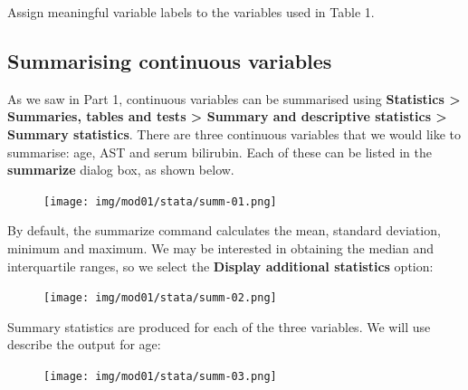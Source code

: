 \documentclass[
  a4paper,
]{memoir}
\begin{document}
\begin{tcolorbox}[enhanced jigsaw, title={TASK}, opacitybacktitle=0.6, colbacktitle=quarto-callout-note-color!10!white, titlerule=0mm, colframe=quarto-callout-note-color-frame, opacityback=0, left=2mm, breakable, bottomtitle=1mm, coltitle=black, bottomrule=.15mm, arc=.35mm, rightrule=.15mm, toptitle=1mm, colback=white, toprule=.15mm, leftrule=.75mm]

Assign meaningful variable labels to the variables used in Table 1.

\end{tcolorbox}

\hypertarget{summarising-continuous-variables}{%
\subsection{Summarising continuous
variables}\label{summarising-continuous-variables}}

As we saw in Part 1, continuous variables can be summarised using
\textbf{Statistics \textgreater{} Summaries, tables and tests
\textgreater{} Summary and descriptive statistics \textgreater{} Summary
statistics}. There are three continuous variables that we would like to
summarise: age, AST and serum bilirubin. Each of these can be listed in
the \textbf{summarize} dialog box, as shown below.

\begin{figure}[H]

{\centering \texttt{[image: img/mod01/stata/summ-01.png]}

}

\end{figure}

By default, the summarize command calculates the mean, standard
deviation, minimum and maximum. We may be interested in obtaining the
median and interquartile ranges, so we select the \textbf{Display
additional statistics} option:

\begin{figure}[H]

{\centering \texttt{[image: img/mod01/stata/summ-02.png]}

}

\end{figure}

Summary statistics are produced for each of the three variables. We will
use describe the output for age:

\begin{figure}[H]

{\centering \texttt{[image: img/mod01/stata/summ-03.png]}

}

\end{figure}
\end{document}
